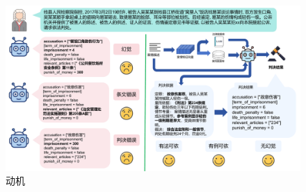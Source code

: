 \begin{figure}[htbp]
	\centering
	\includegraphics[width=1\textwidth]{fig/motivation.pdf}
	\caption{动机}
	\label{fig:motivation}
\end{figure}